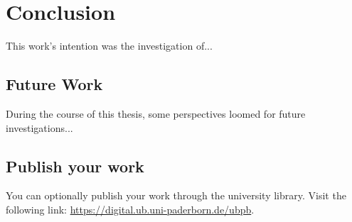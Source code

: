 \chapter{Conclusion} 
\label{cha:conclusion}

This work's intention was the investigation of...

\section{Future Work}

During the course of this thesis, some perspectives loomed for future investigations...


\section{Publish your work}
You can optionally publish your work through the university library. Visit the following link: \href{https://digital.ub.uni-paderborn.de/ubpb}{https://digital.ub.uni-paderborn.de/ubpb}.